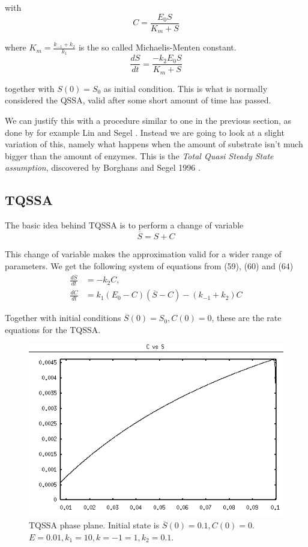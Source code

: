 \documentclass[12pt]{article}
\begin{document}
with
\begin{equation}
C = \frac{E_0 S}{K_m +S}
\end{equation}

where $K_m = \frac{k_{-1} + k_2}{k_1}$ is the so called {Michaelis-Menten
constant}.
\begin{equation}
\frac{dS}{dt} = \frac{-k_2 E_0 S}{K_m + S}
\end{equation}

together with $S(0) = S_0$ as initial condition. This is what is
normally considered the QSSA, valid after some short amount of time
has passed.

We can justify this with a procedure similar to one in the previous
section, as done by for example Lin and Segel
\cite{lin1974mathematics}. Instead we are going to look at a slight
variation of this, namely what happens when the amount of substrate
isn't much bigger than the amount of enzymes. This is the
\textit{Total Quasi Steady State assumption}, discovered by Borghans
and Segel 1996 \cite{borghans1996extending}.

\subsection{TQSSA}

The basic idea behind TQSSA is to perform a change of variable
\begin{equation}
\overline{S} = S + C
\end{equation}

This change of variable makes the approximation valid for a wider
range of parameters. We get the following system of equations from
(59), (60) and (64)
\begin{align}
\frac{d\overline{S}}{dt} &= - k_2 C, \\
\frac{dC}{dt} &= k_1(E_0-C)(\overline{S}-C)-(k_{-1}+ k_2) C
\end{align}

Together with initial conditions $\overline{S}(0)=S_0, C(0)=0$, these
are the rate equations for the TQSSA.
\begin{figure}[ht!]
\centering
\includegraphics[width=120mm]
{tqssa-phase-plane-b.png}
\caption{TQSSA phase plane. Initial state is $\overline{S}(0)=0.1,
  C(0)=0$. $E=0.01, k_1=10, k={-1}=1, k_2=0.1$.}
\label{overflow}
\end{figure}
\end{document}
